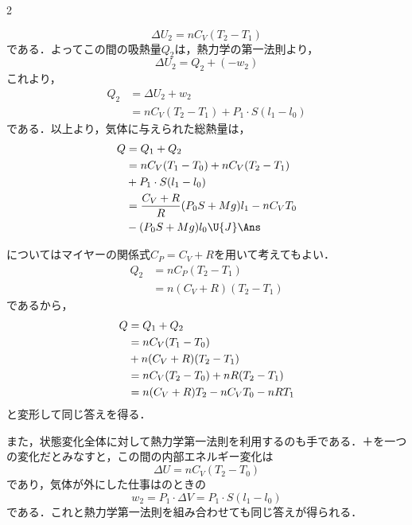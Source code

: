 \begin{multicols}{2}
\begin{komon}
       \[\Delta U_2=nC_V(T_2-T_1)\]
       である．よってこの間の吸熱量$Q_2$は，熱力学の第一法則より，
       \[\Delta U_2=Q_2+(-w_2)\]
       これより，
       \[\begin{aligned}
         Q_2&=\Delta U_2+w_2\\
            &=nC_V(T_2-T_1)+P_1\cdot S(l_1-l_0)
       \end{aligned}\]
       である．以上より，気体に与えられた総熱量は，
       \[\begin{aligned}
         Q&=Q_1+Q_2\\
          &=nC_V(T_1-T_0)+nC_V(T_2-T_1)\\
          &\hspace*{\fill}+P_1\cdot S(l_1-l_0)\\
          &=\frac{C_V+R}{R}(P_0S+Mg)l_1-nC_VT_0\\
          &\hspace*{\fill}-(P_0S+Mg)l_0\U{J}\Ans
       \end{aligned}\]
\end{komon}
\begin{bekkai}
についてはマイヤーの関係式$C_P=C_V+R$を用いて考えてもよい．
\[\begin{aligned}
  Q_2&=nC_P(T_2-T_1)\\
     &=n(C_V+R)(T_2-T_1)
\end{aligned}\]
であるから，
\[\begin{aligned}
  Q&=Q_1+Q_2\\
   &=nC_V(T_1-T_0)\\
   &\hspace*{\fill}+n(C_V+R)(T_2-T_1)\\
   &=nC_V(T_2-T_0)+nR(T_2-T_1)\\
   &=n(C_V+R)T_2-nC_VT_0-nRT_1
\end{aligned}\]
と変形して同じ答えを得る．

また，状態変化全体に対して熱力学第一法則を利用するのも手である．＋を一つの変化だとみなすと，この間の内部エネルギー変化は
\[\Delta U=nC_V(T_2-T_0)\]
であり，気体が外にした仕事はのときの
\[w_2=P_1\cdot\Delta V=P_1\cdot S(l_1-l_0)\]
である．これと熱力学第一法則を組み合わせても同じ答えが得られる．
\end{bekkai}

\end{multicols}
